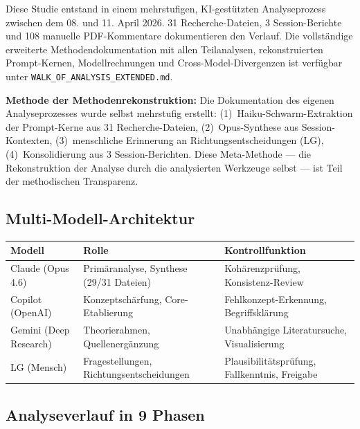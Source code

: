 \documentclass{umbruch-position}
\begin{document}
Diese Studie entstand in einem mehrstufigen, KI-gestützten Analyseprozess zwischen dem 08. und 11. April 2026. 31 Recherche-Dateien, 3 Session-Berichte und 108 manuelle PDF-Kommentare dokumentieren den Verlauf. Die vollständige erweiterte Methodendokumentation mit allen Teilanalysen, rekonstruierten Prompt-Kernen, Modellrechnungen und Cross-Model-Divergenzen ist verfügbar unter \texttt{WALK\_OF\_ANALYSIS\_EXTENDED.md}.

\textbf{Methode der Methodenrekonstruktion:} Die Dokumentation des eigenen Analyseprozesses wurde selbst mehrstufig erstellt: (1)~Haiku-Schwarm-Extraktion der Prompt-Kerne aus 31 Recherche-Dateien, (2)~Opus-Synthese aus Session-Kontexten, (3)~menschliche Erinnerung an Richtungsentscheidungen (LG), (4)~Konsolidierung aus 3 Session-Berichten. Diese Meta-Methode --- die Rekonstruktion der Analyse durch die analysierten Werkzeuge selbst --- ist Teil der methodischen Transparenz.

\subsection*{Multi-Modell-Architektur}

{\small
\begin{tabularx}{\textwidth}{l l X}
\toprule
\textbf{Modell} & \textbf{Rolle} & \textbf{Kontrollfunktion} \\
\midrule
Claude (Opus 4.6) & Primäranalyse, Synthese (29/31 Dateien) & Kohärenzprüfung, Konsistenz-Review \\
\addlinespace
Copilot (OpenAI) & Konzeptschärfung, Core-Etablierung & Fehlkonzept-Erkennung, Begriffsklärung \\
\addlinespace
Gemini (Deep Research) & Theorierahmen, Quellenergänzung & Unabhängige Literatursuche, Visualisierung \\
\addlinespace
LG (Mensch) & Fragestellungen, Richtungsentscheidungen & Plausibilitätsprüfung, Fallkenntnis, Freigabe \\
\bottomrule
\end{tabularx}
}

\subsection*{Analyseverlauf in 9 Phasen}
\end{document}
